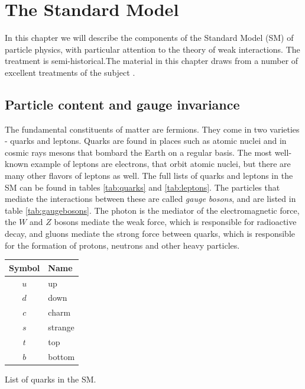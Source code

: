 \chapter{The Standard Model}\label{ch:sm}

\newcommand{\ct}{\cos\theta_w}
\newcommand{\st}{\sin\theta_w}

In this chapter we will describe the components of the Standard Model (SM) of particle physics, with particular attention to the theory of weak interactions. The treatment is semi-historical.The material in this chapter draws from a number of excellent treatments of the subject \citep{Cheng1985,Schwartz2014,Zee2010,Peskin:1995ev}.

\section{Particle content and gauge invariance}\label{sec:gauge_invariance}

The fundamental constituents of matter are fermions. They come in two varieties - quarks and leptons. Quarks are found in places such as atomic nuclei and in cosmic rays mesons that bombard the Earth on a regular basis. The most well-known example of leptons are electrons, that orbit atomic nuclei, but there are many other flavors of leptons as well. The full lists of quarks and leptons in the SM can be found in tables \ref{tab:quarks} and \ref{tab:leptons}. The particles that mediate the interactions between these are called \emph{gauge bosons}, and are listed in table \ref{tab:gaugebosons}. The photon is the mediator of the electromagnetic force, the $W$ and $Z$ bosons mediate the weak force, which is responsible for radioactive decay, and gluons mediate the strong force between quarks, which is responsible for the formation of protons, neutrons and other heavy particles.

\begin{margintable}[-15cm]
  \centering
  \begin{tabular}{c|l}
    Symbol & Name \\
  \hline
    $u$ & up\\
    $d$ & down \\
    $c$ & charm \\
    $s$ & strange \\
    $t$ & top \\
    $b$ & bottom \\
  \end{tabular}
  \caption{List of quarks in the SM.}
  \label{tab:quarks}
\end{margintable}

